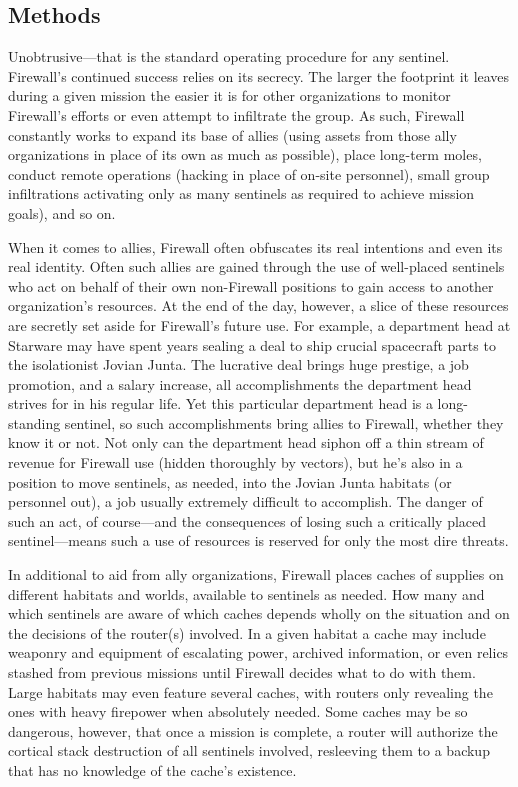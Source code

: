 \subsection{Methods } 

Unobtrusive—that is the standard operating procedure for any sentinel. Firewall's continued success relies on its secrecy. The larger the footprint it leaves during a given mission the easier it is for other organizations to monitor Firewall's efforts or even attempt to infiltrate the group. As such, Firewall constantly works to expand its base of allies (using assets from those ally organizations in place of its own as much as possible), place long-term moles, conduct remote operations (hacking in place of on-site personnel), small group infiltrations activating only as many sentinels as required to achieve mission goals), and so on. 

When it comes to allies, Firewall often obfuscates its real intentions and even its real identity. Often such allies are gained through the use of well-placed sentinels who act on behalf of their own non-Firewall positions to gain access to another organization's resources. At the end of the day, however, a slice of these resources are secretly set aside for Firewall's future use. For example, a department head at Starware may have spent years sealing a deal to ship crucial spacecraft parts to the isolationist Jovian Junta. The lucrative deal brings huge prestige, a job promotion, and a salary increase, all accomplishments the department head strives for in his regular life. Yet this particular department head is a long-standing sentinel, so such accomplishments bring allies to Firewall, whether they know it or not. Not only can the department head siphon off a thin stream of revenue for Firewall use (hidden thoroughly by vectors), but he's also in a position to move sentinels, as needed, into the Jovian Junta habitats (or personnel out), a job usually extremely difficult to accomplish. The danger of such an act, of course—and the consequences of losing such a critically placed sentinel—means such a use of resources is reserved for only the most dire threats. 

In additional to aid from ally organizations, Firewall places caches of supplies on different habitats and worlds, available to sentinels as needed. How many and which sentinels are aware of which caches depends wholly on the situation and on the decisions of the router(s) involved. In a given habitat a cache may include weaponry and equipment of escalating power, archived information, or even relics stashed from previous missions until Firewall decides what to do with them. Large habitats may even feature several caches, with routers only revealing the ones with heavy firepower when absolutely needed. Some caches may be so dangerous, however, that once a mission is complete, a router will authorize the cortical stack destruction of all sentinels involved, resleeving them to a backup that has no knowledge of the cache's existence. 

